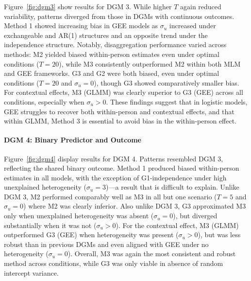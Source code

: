 Figure~\ref{fig:dgm3} show results for DGM 3. While higher \(T\) again reduced variability, patterns diverged from those in DGMs with continuous outcomes. Method 1 showed increasing bias in GEE models as \(\sigma_u\) increased under exchangeable and AR(1) structures and an opposite trend under the independence structure. Notably, disaggregation performance varied across methods: M2 yielded biased within-person estimates even under optimal conditions ($T = 20$), while M3 consistently outperformed M2 within both MLM and GEE frameworks. G3 and G2 were both biased, even under optimal conditions ($T = 20$ and $\sigma_u = 0$), though G3 showed comparatively smaller bias. For contextual effects, M3 (GLMM) was clearly superior to G3 (GEE) across all conditions, especially when \(\sigma_u > 0\). These findings suggest that in logistic models, GEE struggles to recover both within-person and contextual effects, and that within GLMM, Method 3 is essential to avoid bias in the within-person effect.



\paragraph{DGM 4: Binary Predictor and Outcome}

Figure~\ref{fig:dgm4} display results for DGM 4. Patterns resembled DGM 3, reflecting the shared binary outcome. Method 1 produced biased within-person estimates in all models, with the exception of G1-independence under high unexplained heterogeneity (\(\sigma_u = 3\))—a result that is difficult to explain. Unlike DGM 3, M2 performed comparably well as M3 in all but one scenario ($T = 5$ and $\sigma_u = 0$) where M2 was clearly inferior. Also unlike DGM 3, G3 approximated M3 only when unexplained heterogeneity was absent (\(\sigma_u = 0\)), but diverged substantially when it was not (\(\sigma_u > 0\)). For the contextual effect, M3 (GLMM) outperformed G3 (GEE) when heterogeneity was present (\(\sigma_u > 0\)), but was less robust than in previous DGMs and even aligned with GEE under no heterogeneity (\(\sigma_u = 0\)). Overall, M3 was again the most consistent and robust method across conditions, while G3 was only viable in absence of random intercept variance.




